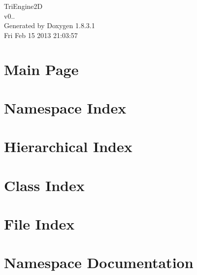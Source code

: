 \documentclass{book}
\begin{document}
\hypersetup{pageanchor=false,citecolor=blue}
\begin{titlepage}
\vspace*{7cm}
\begin{center}
{\Large Tri\-Engine2\-D \\[1ex]\large v0.. }\\
\vspace*{1cm}
{\large Generated by Doxygen 1.8.3.1}\\
\vspace*{0.5cm}
{\small Fri Feb 15 2013 21:03:57}\\
\end{center}
\end{titlepage}
\clearemptydoublepage
{}
\tableofcontents
\clearemptydoublepage
{}
\hypersetup{pageanchor=true,citecolor=blue}
\chapter{Main Page}
\label{index}\hypertarget{index}{}
\chapter{Namespace Index}

\chapter{Hierarchical Index}

\chapter{Class Index}

\chapter{File Index}

\chapter{Namespace Documentation}













\end{document}
